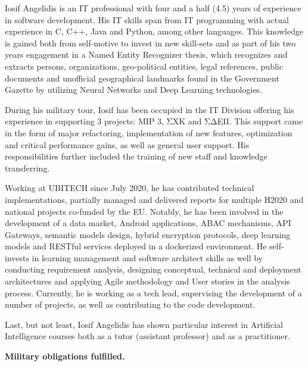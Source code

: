 \par{
Iosif Angelidis is an IT professional with four and a half (4.5) years of experience in software development. His IT skills span from IT programming with actual experience in C, C++, Java and Python, among other languages. This knowledge is gained both from self-motive to invest in new skill-sets and as part of his two years engagement in a Named Entity Recognizer thesis, which recognizes and extracts persons, organizations, geo-political entities, legal references, public documents and unofficial geographical landmarks found in the Government Gazette by utilizing Neural Networks and Deep Learning technologies.}

\par{During his military tour, Iosif has been occupied in the IT Division offering his experience in supporting 3 projects: MIP 3, ΣΧΚ and ΣΔΕΠ. This support came in the form of major refactoring, implementation of new features, optimization and critical performance gains, as well as general user support. His responsibilities further included the training of new staff and knowledge transferring.}

\par{Working at UBITECH since July 2020, he has contributed technical implementations, partially managed and delivered reports for multiple H2020 and national projects co-funded by the EU. Notably, he has been involved in the development of a data market, Android applications, ABAC mechanisms, API Gateways, semantic models design, hybrid encryption protocols, deep learning models and RESTful services deployed in a dockerized environment. He self-invests in learning management and software architect skills as well by conducting requirement analysis, designing conceptual, technical and deployment architectures and applying Agile methodology and User stories in the analysis process. Currently, he is working as a tech lead, supervising the development of a number of projects, as well as contributing to the code development.}

\par{Last, but not least, Iosif Angelidis has shown particular interest in Artificial Intelligence courses both as a tutor (assistant professor) and as a practitioner.}

\par{\textbf{Military obligations fulfilled.} }
